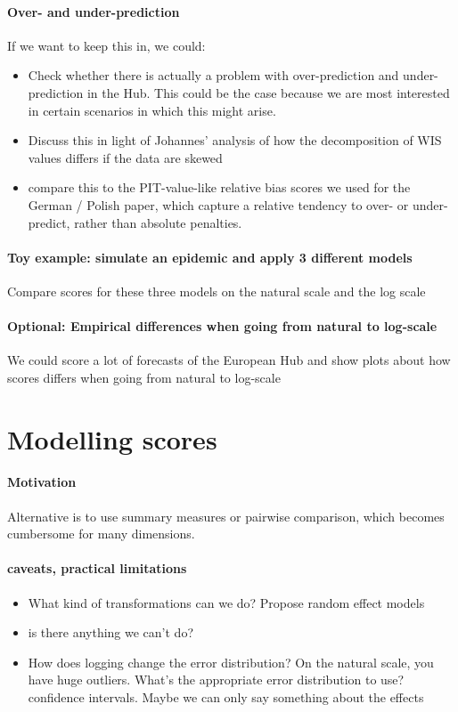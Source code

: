 \documentclass{article}
\begin{document}
\paragraph{Over- and under-prediction}
If we want to keep this in, we could: 
\begin{itemize}
    \item Check whether there is actually a problem with over-prediction and under-prediction in the Hub. This could be the case because we are most interested in certain scenarios in which this might arise. 
    \item Discuss this in light of Johannes' analysis of how the decomposition of WIS values differs if the data are skewed
    \item compare this to the PIT-value-like relative bias scores we used for the German / Polish paper, which capture a relative tendency to over- or under-predict, rather than absolute penalties. 
\end{itemize}

\paragraph{Toy example: simulate an epidemic and apply 3 different models} Compare scores for these three models on the natural scale and the log scale

\paragraph{Optional: Empirical differences when going from natural to log-scale} 
We could score a lot of forecasts of the European Hub and show plots about how scores differs when going from natural to log-scale


\section{Modelling scores}
\paragraph{Motivation} Alternative is to use summary measures or pairwise comparison, which becomes cumbersome for many dimensions. 

\paragraph{caveats, practical limitations}
\begin{itemize}
    \item What kind of transformations can we do? Propose random effect models
    \item is there anything we can't do? 
    \item How does logging change the error distribution? On the natural scale, you have huge outliers. What's the appropriate error distribution to use? confidence intervals. Maybe we can only say something about the effects
\end{itemize}
\end{document}
